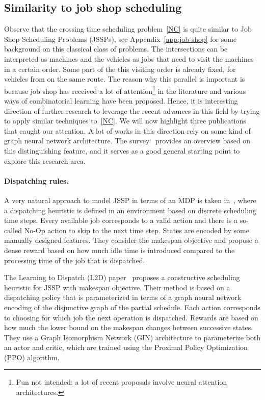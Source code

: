 \documentclass{report}
\theoremstyle{definition}
\theoremstyle{plain}
\begin{document}


\subsection{Similarity to job shop scheduling}

Observe that the crossing time scheduling problem~\eqref{NC} is quite similar to
Job Shop Scheduling Problems (JSSPs), see Appendix~\ref{app:job-shop} for some
background on this classical class of problems.
%
The intersections can be interpreted as machines and the vehicles as jobs that
need to visit the machines in a certain order. Some part of the this visiting
order is already fixed, for vehicles from on the same route.
%
The reason why this parallel is important is because job shop has received a lot
of attention\footnote{Pun not intended: a lot of recent proposals involve 
  neural attention architectures.} in the literature and various ways of
combinatorial learning have been proposed.
%
Hence, it is interesting direction of further research to leverage the recent
advances in this field by trying to apply similar techniques to~\eqref{NC}.
%
We will now highlight three publications that caught our attention.
%
A lot of works in this direction rely on some kind of graph neural network
architecture. The survey~\cite{smitGraphNeuralNetworks2024} provides an overview
based on this distinguishing feature, and it serves as a good general starting
point to explore this research area.

\paragraph{Dispatching rules.}
A very natural approach to model JSSP in terms of an MDP is taken
in~\cite{tasselReinforcementLearningEnvironment2021}, where a dispatching
heuristic is defined in an environment based on discrete scheduling time steps.
%
Every available job corresponds to a valid action and there is a so-called No-Op
action to skip to the next time step. States are encoded by some manually
designed features. They consider the makespan objective and propose a dense
reward based on how much idle time is introduced compared to the processing time
of the job that is dispatched.

The Learning to Dispatch (L2D) paper~\cite{zhangLearningDispatchJob2020}
proposes a constructive scheduling heuristic for JSSP with makespan objective.
Their method is based on a dispatching policy that is parameterized in terms of
a graph neural network encoding of the disjunctive graph of the partial
schedule.
%
Each action corresponds to choosing for which job the next operation is
dispatched. Rewards are based on how much the lower bound on the makespan
changes between successive states. They use a Graph Isomorphism Network (GIN)
architecture to parameterize both an actor and critic, which are trained using
the Proximal Policy Optimization (PPO) algorithm.
\end{document}
